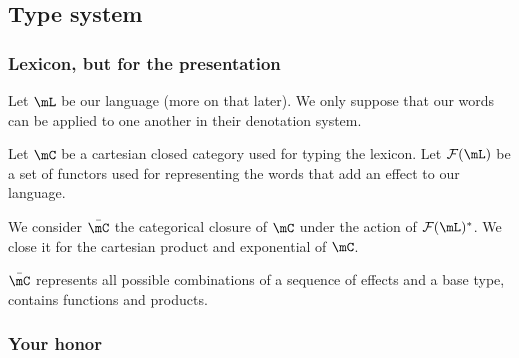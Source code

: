 \documentclass[math, english, info]{beamercours}
\begin{document}
\subsection{Type system}
\begin{frame}
	\frametitle{Lexicon, but for the presentation}
	Let $\mL$ be our language (more on that later).
	We only suppose that our words can be applied to one another in their
	denotation system.

	\pause

	Let $\mC$ be a cartesian closed category used for typing the lexicon.
	Let $\mathcal{F}(\mL)$ be a set of functors used for representing the words
	that add an effect to our language.

	\pause\smallskip

	We consider $\bar{\mC}$ the categorical closure of $\mC$ under the action
	of $\mathcal{F}(\mL)^{*}$.
	We close it for the cartesian product and exponential of $\mC$.

	$\bar{\mC}$ represents all possible combinations of a sequence of effects
	and a base type, contains functions and products.
\end{frame}

\begin{frame}[fragile]
	\frametitle{Your honor}
\end{frame}
\end{document}
